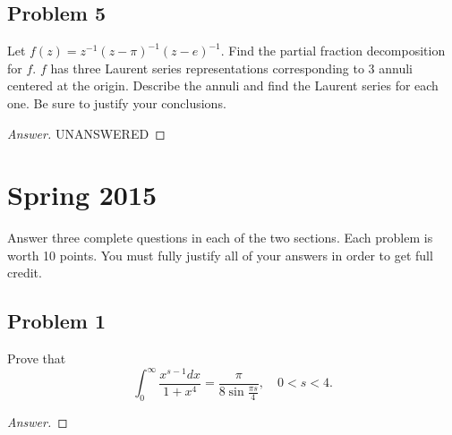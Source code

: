 \documentclass[12pt]{article}
\newcommand\inv[1]{#1^{-1}}
\theoremstyle{definition}
\begin{document}
\subsection{Problem 5}
Let $f(z) = \inv{z} \inv{ (z-\pi) } \inv{ (z-e) }$. Find the partial fraction decomposition for $f$. $f$ has three Laurent series representations corresponding to 3 annuli centered at the origin. Describe the annuli and find the Laurent series for each one. Be sure to justify your conclusions.
\begin{proof}[Answer]
    UNANSWERED
\end{proof}
\newpage
\section{Spring 2015}
Answer three complete questions in each of the two sections. Each problem is worth 10 points. You must fully justify all of your answers in order to get full credit.
\subsection{Problem 1}
Prove that 
\[
    \int_0^{\infty} \frac{x^{s-1} dx}{1+x^4} = \frac{\pi}{8 \sin \frac{\pi s}{4}} , \quad 0 < s < 4.
\]
\begin{proof}[Answer]
    
\end{proof}
\end{document}
